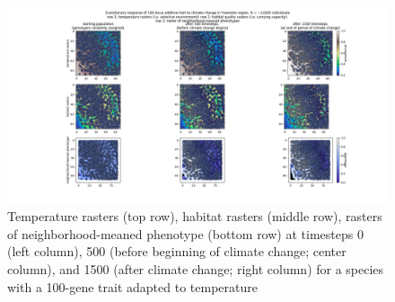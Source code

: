 ﻿\documentclass{article}
\begin{document}
\begin{figure}[h!]
\includegraphics[width=175mm]{./img/example/yosemite_results.png}
        \caption{Temperature rasters (top row), habitat rasters (middle row), rasters of neighborhood-meaned phenotype (bottom row) at timesteps 0 (left column), 500 (before beginning of climate change; center column), and 1500 (after climate change; right column) for a species with a 100-gene trait adapted to temperature}
        \label{fig:yosemite}
\end{figure}
\end{document}
